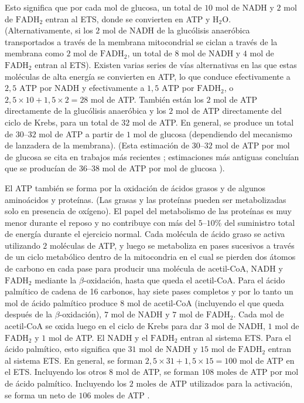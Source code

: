 \documentclass[12pt]{book}
\begin{document}
Esto significa que por cada mol de glucosa, un total de $10\text{ mol}$ de NADH y $2\text{ mol}$ de $\text{FADH}_2$ entran al ETS, donde se convierten en ATP y $\text{H}_2\text{O}$. (Alternativamente, si los $2\text{ mol}$ de NADH de la glucólisis anaeróbica transportados a través de la membrana mitocondrial se ciclan a través de la membrana como $2\text{ mol}$ de $\text{FADH}_2$, un total de $8\text{ mol}$ de NADH y $4\text{ mol}$ de $\text{FADH}_2$ entran al ETS). Existen varias series de vías alternativas en las que estas moléculas de alta energía se convierten en ATP, lo que conduce efectivamente a $2,5\text{ ATP}$ por NADH y efectivamente a $1,5\text{ ATP}$ por $\text{FADH}_2$, o $2,5 \times 10 + 1,5 \times 2 = 28\text{ mol}$ de ATP. También están los $2\text{ mol}$ de ATP directamente de la glucólisis anaeróbica y los $2\text{ mol}$ de ATP directamente del ciclo de Krebs, para un total de $32\text{ mol}$ de ATP. En general, se produce un total de $30\text{--}32\text{ mol}$ de ATP a partir de $1\text{ mol}$ de glucosa (dependiendo del mecanismo de lanzadera de la membrana). (Esta estimación de $30\text{--}32\text{ mol}$ de ATP por mol de glucosa se cita en trabajos más recientes \cite{57,75}; estimaciones más antiguas concluían que se producían de $36\text{--}38\text{ mol}$ de ATP por mol de glucosa \cite{55}).

El ATP también se forma por la oxidación de ácidos grasos y de algunos aminoácidos y proteínas. (Las grasas y las proteínas pueden ser metabolizadas solo en presencia de oxígeno). El papel del metabolismo de las proteínas es muy menor durante el reposo y no contribuye con más del $5\text{--}10\%$ del suministro total de energía durante el ejercicio normal. Cada molécula de ácido graso se activa utilizando $2$ moléculas de ATP, y luego se metaboliza en pases sucesivos a través de un ciclo metabólico dentro de la mitocondria en el cual se pierden dos átomos de carbono en cada pase para producir una molécula de acetil-CoA, NADH y $\text{FADH}_2$ mediante la $\beta$-oxidación, hasta que queda el acetil-CoA. Para el ácido palmítico de cadena de 16 carbonos, hay siete pases completos y por lo tanto un mol de ácido palmítico produce $8\text{ mol}$ de acetil-CoA (incluyendo el que queda después de la $\beta$-oxidación), $7\text{ mol}$ de NADH y $7\text{ mol}$ de $\text{FADH}_2$. Cada mol de acetil-CoA se oxida luego en el ciclo de Krebs para dar $3\text{ mol}$ de NADH, $1\text{ mol}$ de $\text{FADH}_2$ y $1\text{ mol}$ de ATP. El NADH y el $\text{FADH}_2$ entran al sistema ETS. Para el ácido palmítico, esto significa que $31\text{ mol}$ de NADH y $15\text{ mol}$ de $\text{FADH}_2$ entran al sistema ETS. En general, se forman $2,5 \times 31 + 1,5 \times 15 = 100\text{ mol}$ de ATP en el ETS. Incluyendo los otros $8\text{ mol}$ de ATP, se forman $108\text{ moles}$ de ATP por mol de ácido palmítico. Incluyendo los $2\text{ moles}$ de ATP utilizados para la activación, se forma un neto de $106\text{ moles}$ de ATP \cite{75}.
\end{document}
